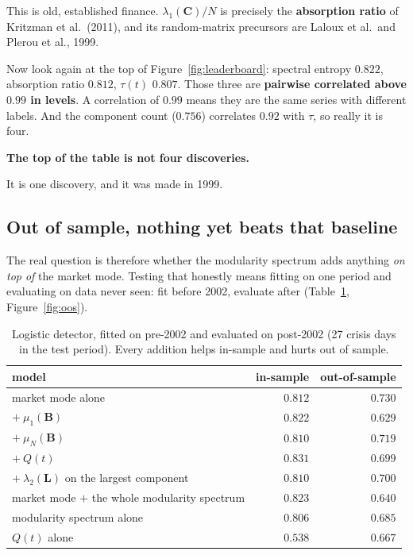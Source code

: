 \documentclass[11pt,a4paper]{article}
\newcommand{\Q}{Q}
\newcommand{\Lap}{\mathbf{L}}
\newcommand{\Bmat}{\mathbf{B}}
\newcommand{\Cmat}{\mathbf{C}}
\newenvironment{aside}[1]
 {\par\vspace{2.5mm}\begin{lrbox}{\asidebox}%
  \begin{minipage}{\dimexpr\textwidth-16pt\relax}\small\textbf{#1}\par\vspace{1mm}}
 {\end{minipage}\end{lrbox}%
  \noindent\setlength{\fboxsep}{7pt}\setlength{\fboxrule}{.4pt}%
  \fcolorbox{Rule}{Panel2}{\usebox{\asidebox}}\par\vspace{2.5mm}}
\begin{document}
This is old, established finance. $\lambda_1(\Cmat)/N$ is precisely the
\textbf{absorption ratio} of Kritzman et al.\ (2011), and its random-matrix
precursors are Laloux et al.\ and Plerou et al., 1999.

Now look again at the top of Figure~\ref{fig:leaderboard}: spectral entropy
$0.822$, absorption ratio $0.812$, $\tau(t)$ $0.807$. Those three are
\textbf{pairwise correlated above $0.99$ in levels}. A correlation of $0.99$
means they are the same series with different labels. And the component count
($0.756$) correlates $0.92$ with $\tau$, so really it is four.

\begin{aside}{The top of the table is not four discoveries.}
It is one discovery, and it was made in 1999.
\end{aside}

\subsection{Out of sample, nothing yet beats that baseline}

The real question is therefore whether the modularity spectrum adds anything
\emph{on top of} the market mode. Testing that honestly means fitting on one
period and evaluating on data never seen: fit before 2002, evaluate after
(Table~\ref{tab:oos}, Figure~\ref{fig:oos}).

\begin{table}[h]
\centering\small
\caption{Logistic detector, fitted on pre-2002 and evaluated on post-2002 (27
crisis days in the test period). Every addition helps in-sample and hurts out of
sample.}
\label{tab:oos}
\begin{tabular}{@{}lrr@{}}
\toprule
model & in-sample & out-of-sample \\
\midrule
market mode alone & $0.812$ & $\mathbf{0.730}$ \\
\quad $+\ \mu_1(\Bmat)$ & $0.822$ & $0.629$ \\
\quad $+\ \mu_N(\Bmat)$ & $0.810$ & $0.719$ \\
\quad $+\ \Q(t)$ & $0.831$ & $0.699$ \\
\quad $+\ \lambda_2(\Lap)$ on the largest component & $0.810$ & $0.700$ \\
\midrule
market mode $+$ the whole modularity spectrum & $0.823$ & $0.640$ \\
modularity spectrum alone & $0.806$ & $0.685$ \\
$\Q(t)$ alone & $0.538$ & $0.667$ \\
\bottomrule
\end{tabular}
\end{table}
\end{document}

